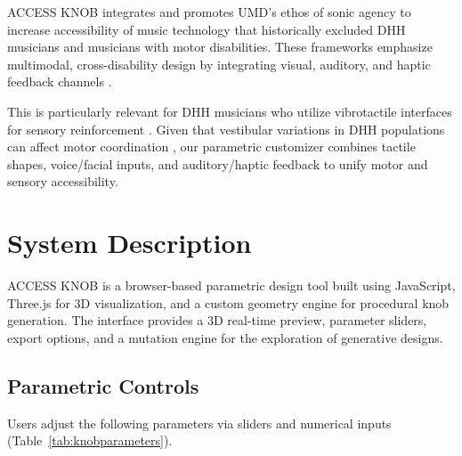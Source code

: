 \documentclass[manuscript,screen,review,anonymous]{acmart}
\begin{document}
ACCESS KNOB integrates and promotes UMD's ethos of sonic agency \cite{labelle2018sonic} to increase accessibility of music technology that historically excluded DHH musicians and musicians with motor disabilities. These frameworks emphasize multimodal, cross-disability design by integrating visual, auditory, and haptic feedback channels \cite{breteche2019deaf, cavdir2022embodied}. %

This is particularly relevant for DHH musicians who utilize vibrotactile interfaces for sensory reinforcement \cite{cavdir2022touch, cavdir2020felt}. Given that vestibular variations in DHH populations can affect motor coordination \cite{wink2018balance, erkilicc2011conceptual}, our parametric customizer combines tactile shapes, voice/facial inputs, and auditory/haptic feedback to unify motor and sensory accessibility.

\section{System Description}

ACCESS KNOB is a browser-based parametric design tool built using JavaScript, Three.js for 3D visualization, and a custom geometry engine for procedural knob generation. The interface provides a 3D real-time preview, parameter sliders, export options, and a mutation engine for the exploration of generative designs.

\subsection{Parametric Controls}
Users adjust the following parameters via sliders and numerical inputs (Table~\ref{tab:knobparameters}).



\end{document}
